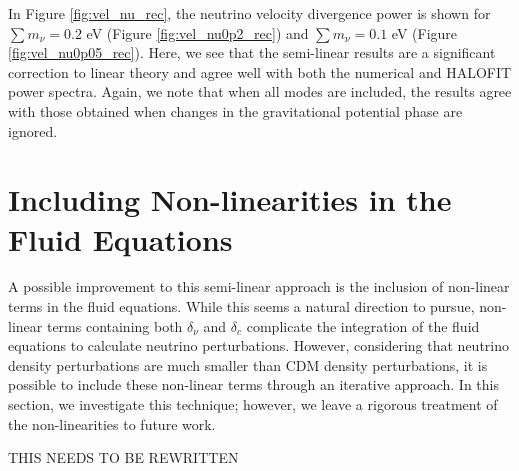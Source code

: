 \documentclass[twocolumn,superscriptaddress,prd]{revtex4}
\newcommand{\halofit}{HALOFIT }
\begin{document}
In Figure \ref{fig:vel_nu_rec}, the neutrino velocity divergence power
is shown 
for $\sum m_\nu = 0.2$ eV (Figure \ref{fig:vel_nu0p2_rec})
and $\sum m_\nu = 0.1$ eV (Figure \ref{fig:vel_nu0p05_rec}). 
Here,
we see that the semi-linear results are a significant correction to
linear theory and agree well with both the numerical and
\halofit power spectra.  
Again, we note that when all modes are
included, the results agree with those obtained
when changes in the gravitational potential phase are ignored.

\section{ Including Non-linearities in the Fluid Equations}
\label{sec:Nonlinear}
A possible improvement to this semi-linear approach 
is the inclusion of non-linear terms in the fluid equations. 
While this seems a natural direction to pursue, 
non-linear terms 
containing both $\delta_\nu$ and $\delta_c$ complicate the
integration of the fluid equations to calculate neutrino perturbations.  However,
considering that neutrino density perturbations are much smaller
than CDM density perturbations, it is possible to include
these non-linear terms through an iterative approach.
In this section, we investigate this technique; %
however, we leave
a rigorous treatment of the non-linearities to future work. 


THIS NEEDS TO BE REWRITTEN 
\end{document}
